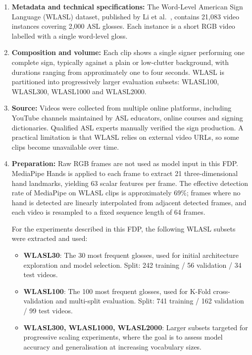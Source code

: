\begin{enumerate}
    \item \textbf{Metadata and technical specifications:} The Word-Level American Sign Language (WLASL) dataset, published by Li et al.~\cite{li2020wlasl},
          contains 21,083 video instances covering 2,000 ASL glosses. Each instance is a short RGB video
          labelled with a single word-level gloss.

    \item \textbf{Composition and volume:} Each clip shows a single signer performing one complete sign, typically against a plain or
          low-clutter background, with durations ranging from approximately one to four seconds. WLASL is
          partitioned into progressively larger evaluation subsets: WLASL100, WLASL300, WLASL1000 and
          WLASL2000.

    \item \textbf{Source:} Videos were collected from multiple online platforms, including YouTube channels maintained by ASL
          educators, online courses and signing dictionaries. Qualified ASL experts manually verified the
          sign production. A practical limitation is that WLASL relies on external video URLs, so some clips
          become unavailable over time.

    \item \textbf{Preparation:} Raw RGB frames are not used as model input in this FDP. MediaPipe Hands
          \cite{zhang2020mediapipehands} is applied to each frame to extract 21 three-dimensional hand
          landmarks, yielding 63 scalar features per frame. The effective detection rate of MediaPipe on
          WLASL clips is approximately 69\%; frames where no hand is detected are linearly interpolated from
          adjacent detected frames, and each video is resampled to a fixed sequence length of 64 frames.

          For the experiments described in this FDP, the following WLASL subsets were extracted and
          used:

          \begin{itemize}
              \item \textbf{WLASL30}: The 30 most frequent glosses, used for initial architecture exploration and model selection. Split: 242 training / 56 validation / 34 test videos.
              \item \textbf{WLASL100}: The 100 most frequent glosses, used for K-Fold cross-validation and multi-split evaluation. Split: 741 training / 162 validation / 99 test videos.
              \item \textbf{WLASL300, WLASL1000, WLASL2000}: Larger subsets targeted for progressive scaling experiments, where the goal is to assess model accuracy and generalisation at increasing vocabulary sizes.
          \end{itemize}

\end{enumerate}

